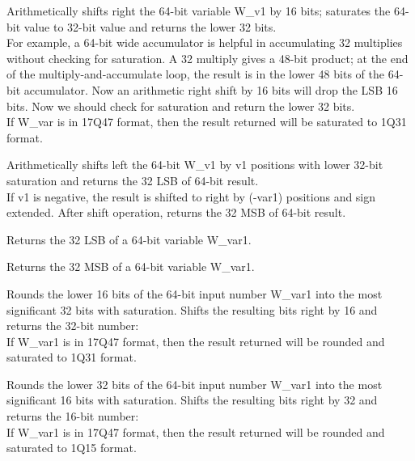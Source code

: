 
Arithmetically shifts right the 64-bit variable W\_v1 by 16 bits; saturates the 64-bit value to 32-bit value and returns the lower 32 bits.\\
For example, a 64-bit wide accumulator is helpful in accumulating 32 multiplies without checking for saturation. 
A 32 multiply gives a 48-bit product; at the end of the multiply-and-accumulate loop, the result is in the lower 48 bits of the 64-bit accumulator. 
Now an arithmetic right shift by 16 bits will drop the LSB 16 bits. 
Now we should check for saturation and return the lower 32 bits.\\
If W\_var is in 17Q47 format, then the result returned will be saturated to 1Q31 format.


Arithmetically shifts left the 64-bit W\_v1 by v1 positions with lower 32-bit saturation and returns the 32 LSB of 64-bit result.\\
If v1 is negative, the result is shifted to right by (-var1) positions and sign extended.
After shift operation, returns the 32 MSB of 64-bit result.


Returns the 32 LSB of a 64-bit variable W\_var1.


Returns the 32 MSB of a 64-bit variable W\_var1.


Rounds the lower 16 bits of the 64-bit input number W\_var1 into the most significant 32 bits with saturation.
Shifts the resulting bits right by 16 and returns the 32-bit number:\\
If W\_var1 is in 17Q47 format, then the result returned will be rounded and saturated to 1Q31 format.


Rounds the lower 32 bits of the 64-bit input number W\_var1 into the most significant 16 bits with saturation.
Shifts the resulting bits right by 32 and returns the 16-bit number:\\
If W\_var1 is in 17Q47 format, then the result returned will be rounded and saturated to 1Q15 format.

